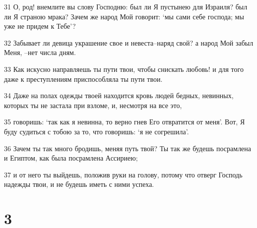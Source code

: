 \par 31 О, род! внемлите вы слову Господню: был ли Я пустынею для Израиля? был ли Я страною мрака? Зачем же народ Мой говорит: `мы сами себе господа; мы уже не придем к Тебе'?
\par 32 Забывает ли девица украшение свое и невеста--наряд свой? а народ Мой забыл Меня, --нет числа дням.
\par 33 Как искусно направляешь ты пути твои, чтобы снискать любовь! и для того даже к преступлениям приспособляла ты пути твои.
\par 34 Даже на полах одежды твоей находится кровь людей бедных, невинных, которых ты не застала при взломе, и, несмотря на все это,
\par 35 говоришь: `так как я невинна, то верно гнев Его отвратится от меня'. Вот, Я буду судиться с тобою за то, что говоришь: `я не согрешила'.
\par 36 Зачем ты так много бродишь, меняя путь твой? Ты так же будешь посрамлена и Египтом, как была посрамлена Ассириею;
\par 37 и от него ты выйдешь, положив руки на голову, потому что отверг Господь надежды твои, и не будешь иметь с ними успеха.

\chapter{3}

